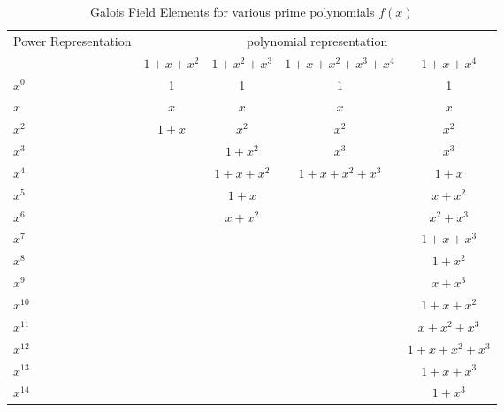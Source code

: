 \begin{table}[htbp]
\caption{Galois Field Elements for various prime polynomials $f(x)$}
\centering
\begin{tabularx}{0.7\textwidth}{X| c|c|c|c} 
\toprule
\multicolumn{1}{c|}{Power Representation}&\multicolumn{4}{c}{polynomial representation}\\
\cmidrule(lr){1-5}
&$1+x+x^2$&$1+x^2+x^3$&$1+x+x^2+x^3+x^4$&$1+x+x^4$\\
\cmidrule(lr){1-5}
$x^0$			&1			&1				&1                                                                   &1\\
$x$			&$x$		&$x$			&$x$                                                              &$x$\\
$x^{2}$		&$1+x$	&$x^2$		&$x^2$                                                  	  &$x^2$\\
$x^{3}$		&			&$1+x^2$		&$x^3$                                                        &$x^3$\\
$x^{4}$ 		& 			&$1+x+x^2$   &$1+x+x^2+x^3$ 					 	& $1+x$\\
$x^{5}$		&			&$1+x$		&                                                                   &$x+x^2$\\
$x^{6}$		&			&$x+x^2$		&                                                                   &$x^2+x^3$\\
$x^{7}$		&			&				&                								&$1+x+x^3$\\
$x^{8}$		&			&				&										&$1+x^2$\\
$x^{9}$		&			&				&										&$x+x^3$\\
$x^{10}$		&			&				&										&$1+x+x^2$\\
$x^{11}$		&			&				&										&$x+x^2+x^3$\\
$x^{12}$		&			&				&										&$1+x+x^2+x^3$\\
$x^{13}$		&			&				&										&$1+x+x^3$\\
$x^{14}$		&			&				&										&$1+x^3$\\
\bottomrule
\end{tabularx}

\label{GF-tables}
\end{table}

 







